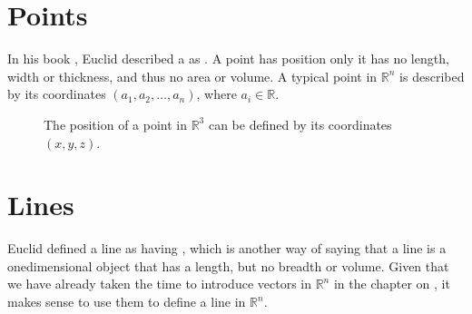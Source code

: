 \documentclass[letterpaper,10pt,english]{jupyterBook}
\let\sphinxpxdimen\pdfpxdimen\else\newdimen\sphinxpxdimen
\begin{document}
\ignorespaces 

\section{Points}
\label{\detokenize{_pages/4.0_Coordinate_geometry:points}}\label{\detokenize{_pages/4.0_Coordinate_geometry:index-1}}\label{\detokenize{_pages/4.0_Coordinate_geometry:points-section}}
\sphinxAtStartPar
In his book , Euclid described a  as . A point has position only \sphinxhyphen{} it has no length, width or thickness, and thus no area or volume. A typical point in \(\mathbb{R}^n\) is described by its co\sphinxhyphen{}ordinates \((a_1,a_2,\dots,a_n)\), where \(a_i \in \mathbb{R}\).

\begin{figure}[htbp]
\centering
\capstart

\noindent\sphinxincludegraphics[width=300\sphinxpxdimen]{{3_R3}.svg}
\caption{The position of a point in \(\mathbb{R}^3\) can be defined by its co\sphinxhyphen{}ordinates \((x, y, z)\).}\label{\detokenize{_pages/4.0_Coordinate_geometry:point-in-r3-figure}}\end{figure}

\sphinxstepscope

\ignorespaces 

\section{Lines}
\label{\detokenize{_pages/4.1_Lines:lines}}\label{\detokenize{_pages/4.1_Lines:index-0}}\label{\detokenize{_pages/4.1_Lines:lines-section}}\label{\detokenize{_pages/4.1_Lines::doc}}
\sphinxAtStartPar
Euclid defined a line as having , which is another way of saying that a line is a one\sphinxhyphen{}dimensional object that has a length, but no breadth or volume. Given that we have already taken the time to introduce vectors in \(\mathbb{R}^n\) in the chapter on {\hyperref[\detokenize{_pages/3.0_Vectors:vectors-chapter}]{}}, it makes sense to use them to define a line in \(\mathbb{R}^n\).
\end{document}
